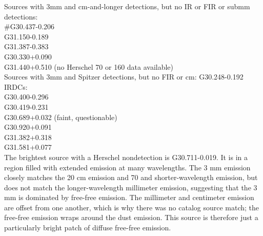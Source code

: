 \documentclass[twocolumn]{aastex62}
\begin{document}
Sources with 3mm and cm-and-longer detections, but no IR or FIR or submm detections:\\
#G30.437-0.206 \\
G31.150-0.189 \\
G31.387-0.383 \\
G30.330+0.090 \\
G31.440+0.510 (no Herschel 70 \um or 160 \um data available) \\


Sources with 3mm and Spitzer detections, but no FIR or cm:
G30.248-0.192 \\

IRDCs:\\
G30.400-0.296 \\
G30.419-0.231 \\
G30.689+0.032 (faint, questionable)\\
G30.920+0.091 \\
G31.382+0.318 \\
G31.581+0.077 \\





The brightest source with a Herschel nondetection is G30.711-0.019.  It is in a
region filled with extended emission at many wavelengths.  The 3 mm emission
closely matches the 20 cm emission and 70 \um and shorter-wavelength emission,
but does not match the longer-wavelength millimeter emission, suggesting that
the 3 mm is dominated by free-free emission.  The millimeter and centimeter
emission are offset from one another, which is why there was no catalog source
match; the free-free emission wraps around the dust emission.  This source is
therefore just a particularly bright patch of diffuse free-free emission.
\end{document}
